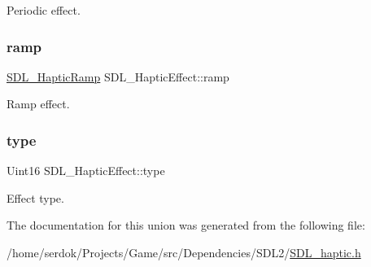 Periodic effect. \mbox{\label{unionSDL__HapticEffect_a1d32ef4c2d1cc89dc938b392f6ad81bd}} 
\subsubsection{\texorpdfstring{ramp}{ramp}}
{\footnotesize\ttfamily \hyperlink{structSDL__HapticRamp}{S\+D\+L\+\_\+\+Haptic\+Ramp} S\+D\+L\+\_\+\+Haptic\+Effect\+::ramp}

Ramp effect. \mbox{\label{unionSDL__HapticEffect_a5ff6cfd8da91537091e9a6c2108cb179}} 
\subsubsection{\texorpdfstring{type}{type}}
{\footnotesize\ttfamily Uint16 S\+D\+L\+\_\+\+Haptic\+Effect\+::type}

Effect type. 

The documentation for this union was generated from the following file\+:\begin{DoxyCompactItemize}
\item 
/home/serdok/\+Projects/\+Game/src/\+Dependencies/\+S\+D\+L2/\hyperlink{SDL__haptic_8h}{S\+D\+L\+\_\+haptic.\+h}\end{DoxyCompactItemize}
